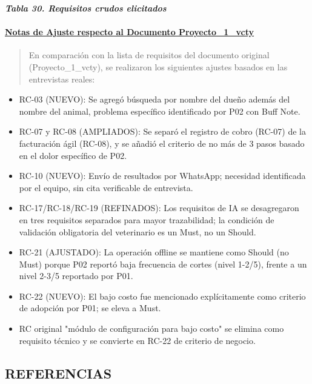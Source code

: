 \documentclass[
]{article}
\begin{document}
\protect{}\label{_bookmark117}{}\emph{\textbf{Tabla 30.
Requisitos crudos elicitados}}

\paragraph{\texorpdfstring{ \ul{Notas de Ajuste respecto al Documento
Proyecto\_1\_vcty}
}{ Notas de Ajuste respecto al Documento Proyecto\_1\_vcty }}\label{notas-de-ajuste-respecto-al-documento-proyecto_1_vcty}

\begin{quote}
En comparación con la lista de requisitos del documento original
(Proyecto\_1\_vcty), se realizaron los siguientes ajustes basados en las
entrevistas reales:
\end{quote}

\begin{itemize}
\item
  RC-03 (NUEVO): Se agregó búsqueda por nombre del dueño además del
  nombre del animal, problema específico identificado por P02 con
  Buff Note.
\item
  RC-07 y RC-08 (AMPLIADOS): Se separó el registro de cobro (RC-07) de
  la facturación ágil (RC-08), y se añadió el criterio de no más de 3
  pasos basado en el dolor específico de P02.
\item
  RC-10 (NUEVO): Envío de resultados por WhatsApp; necesidad identificada por el equipo, sin cita verificable de entrevista.
\item
  RC-17/RC-18/RC-19 (REFINADOS): Los requisitos de IA se desagregaron en
  tres requisitos separados para mayor trazabilidad; la condición de
  validación obligatoria del veterinario es un Must, no un Should.
\item
  RC-21 (AJUSTADO): La operación offline se mantiene como Should (no
  Must) porque P02 reportó baja frecuencia de cortes (nivel 1-2/5),
  frente a un nivel 2-3/5 reportado por P01.
\item
  RC-22 (NUEVO): El bajo costo fue mencionado explícitamente como
  criterio de adopción por P01; se eleva a Must.
\item
  RC original "módulo de configuración para bajo costo" se elimina como
  requisito técnico y se convierte en RC-22 de criterio de negocio.
\end{itemize}

\subsection{REFERENCIAS}\label{referencias-1}



\end{document}
